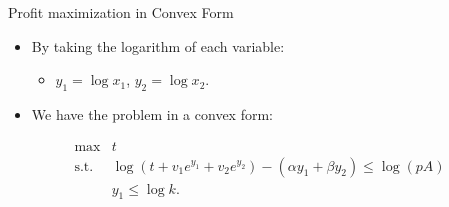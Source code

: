 \documentclass[
  ignorenonframetext,
  aspectratio=169,
  serif,onlymath]{beamer}
\providecommand{\tightlist}{%
  \setlength{\itemsep}{0pt}\setlength{\parskip}{0pt}}
\begin{document}
\begin{frame}{Profit maximization in Convex Form}
\protect\hypertarget{profit-maximization-in-convex-form}{}

\begin{itemize}
\item
  By taking the logarithm of each variable:

  \begin{itemize}
  \tightlist
  \item
    \(y_1 = \log x_1\), \(y_2 = \log x_2\).
  \end{itemize}
\item
  We have the problem in a convex form:
\end{itemize}

\[\begin{array}{ll}
    \text{max}  & t \\
    \text{s.t.} & \log(t + v_1 e^{y_1} + v_2 e^{y_2}) - (\alpha y_1 + \beta y_2) \le \log(pA) \\
                & y_1 \le \log k.
\end{array}\]

\end{frame}
\end{document}
